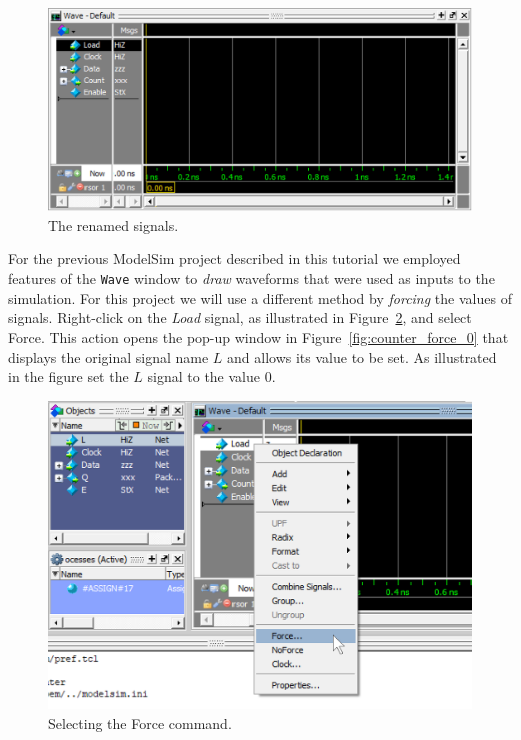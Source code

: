 \documentclass[11pt, twoside, pdftex]{article}
\begin{document}
\begin{figure}[H]
   \begin{center}
      \includegraphics[scale=.75]{figures/counter_names.png}
   \caption{The renamed signals.} 
	 \label{fig:counter_names}
	 \end{center}
\end{figure}

For the previous ModelSim project described in this tutorial we employed features of the 
\texttt{Wave} window to {\it draw} waveforms that were used as inputs to the simulation. For 
this project we will use a different method by {\it forcing} the values of signals. Right-click
on the {\it Load} signal, as illustrated in Figure~\ref{fig:counter_force}, and select 
{\sf Force}. This action opens the pop-up window in Figure~\ref{fig:counter_force_0} that 
displays the original signal name $L$ and allows its value to be set. As illustrated in
the figure set the $L$ signal to the value 0.

\begin{figure}[H]
   \begin{center}
      \includegraphics[scale=.75]{figures/counter_force.png}
       \caption{Selecting the {\sf Force} command.} 
	 \label{fig:counter_force}
	 \end{center}
\end{figure}
\end{document}
